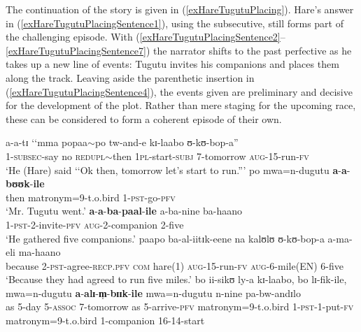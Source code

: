   
The continuation of the story is given in (\ref{exHareTugutuPlacing}). Hare's answer in (\ref{exHareTugutuPlacingSentence1}), using the subsecutive, still forms part of the challenging episode. With (\ref{exHareTugutuPlacingSentence2}--\ref{exHareTugutuPlacingSentence7}) the narrator shifts to the past perfective as he takes up a new line of events: Tugutu invites his companions and places them along the track. Leaving aside the parenthetic insertion in (\ref{exHareTugutuPlacingSentence4}), the events given are preliminary and decisive for the development of the plot. Rather than mere staging for the upcoming race, these can be considered to form a coherent episode of their own. 
\largerpage
\begin{exe}
\ex \label{exHareTugutuPlacing}\begin{xlist}
\ex \label{exHareTugutuPlacingSentence1}\gll a-a-tɪ \textup{\lq\lq}mma popaa$\sim$po tw-and-e kɪ-laabo ʊ-kʊ-bop-a\textup{''}\\
1-\textsc{subsec}-say \phantom{\lq\lq}no \textsc{redupl}$\sim$then \textsc{1pl}-start-\textsc{subj} 7-tomorrow \textsc{aug}-15-run-\textsc{fv}\\
\glt \lq He (Hare) said \lq\lq Ok then, tomorrow let's start to run.''{}'
\ex \label{exHareTugutuPlacingSentence2} \gll po mwa=n-dugutu \textbf{a}-\textbf{a}-\textbf{bʊʊk}-\textbf{ile}\\
then matronym=9-t.o.bird 1-\textsc{pst}-go-\textsc{pfv}\\
\glt \lq Mr. Tugutu went.'
\ex\label{exHareTugutuPlacingSentence3} \gll \textbf{a}-\textbf{a}-\textbf{ba}-\textbf{paal}-\textbf{ile} a-ba-nine ba-haano\\
1-\textsc{pst}-2-invite-\textsc{pfv} \textsc{aug}-2-companion 2-five\\
\glt \lq He gathered five companions.'
\ex\label{exHareTugutuPlacingSentence4} \gll paapo ba-al-iitɪk-eene na kalʊlʊ ʊ-kʊ-bop-a a-ma-eli ma-haano\\
because 2-\textsc{pst}-agree-\textsc{recp.pfv} \textsc{com} hare(1) \textsc{aug}-15-run-\textsc{fv} \textsc{aug}-6-mile(EN) 6-five\\
\glt \lq Because they had agreed to run five miles.'
\ex\label{exHareTugutuPlacingSentence5} \gll bo ii-sikʊ ly-a kɪ-laabo, bo lɪ-fik-ile, mwa=n-dugutu \textbf{a}-\textbf{alɪ}-\textbf{m̩}-\textbf{bɪɪk}-\textbf{ile} mwa=n-dugutu n-nine pa-bw-andɪlo\\
as 5-day 5-\textsc{assoc} 7-tomorrow as 5-arrive-\textsc{pfv} matronym=9-t.o.bird 1-\textsc{pst}-1-put-\textsc{fv} matronym=9-t.o.bird 1-companion 16-14-start\\

\end{xlist}
\end{exe}
